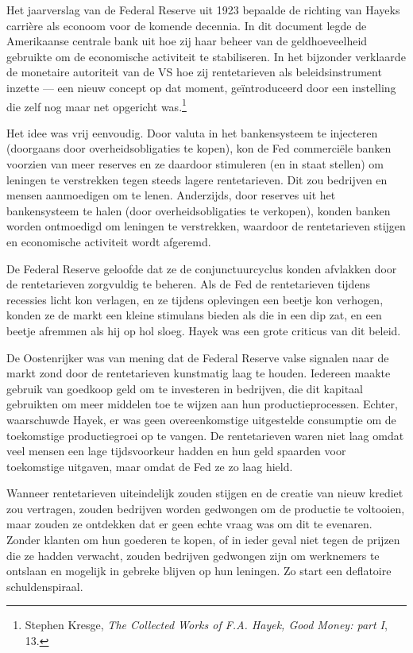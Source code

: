 \documentclass[
  a5paper,
  smalldemyvopaper,11pt,twoside,onecolumn,openright,extrafontsizes,
hidelinks]{memoir}
\begin{document}
Het jaarverslag van de Federal Reserve uit 1923 bepaalde de richting van
Hayeks carrière als econoom voor de komende decennia. In dit document
legde de Amerikaanse centrale bank uit hoe zij haar beheer van de
geldhoeveelheid gebruikte om de economische activiteit te stabiliseren.
In het bijzonder verklaarde de monetaire autoriteit van de VS hoe zij
rentetarieven als beleidsinstrument inzette --- een nieuw concept op dat
moment, geïntroduceerd door een instelling die zelf nog maar net
opgericht was.\footnote{Stephen Kresge, \emph{The Collected Works of
  F.A. Hayek, Good Money: part I}, 13.}

Het idee was vrij eenvoudig. Door valuta in het bankensysteem te
injecteren (doorgaans door overheidsobligaties te kopen), kon de Fed
commerciële banken voorzien van meer reserves en ze daardoor stimuleren
(en in staat stellen) om leningen te verstrekken tegen steeds lagere
rentetarieven. Dit zou bedrijven en mensen aanmoedigen om te lenen.
Anderzijds, door reserves uit het bankensysteem te halen (door
overheidsobligaties te verkopen), konden banken worden ontmoedigd om
leningen te verstrekken, waardoor de rentetarieven stijgen en
economische activiteit wordt afgeremd.

De Federal Reserve geloofde dat ze de conjunctuurcyclus konden afvlakken
door de rentetarieven zorgvuldig te beheren. Als de Fed de rentetarieven
tijdens recessies licht kon verlagen, en ze tijdens oplevingen een
beetje kon verhogen, konden ze de markt een kleine stimulans bieden als
die in een dip zat, en een beetje afremmen als hij op hol sloeg. Hayek
was een grote criticus van dit beleid.

De Oostenrijker was van mening dat de Federal Reserve valse signalen
naar de markt zond door de rentetarieven kunstmatig laag te houden.
Iedereen maakte gebruik van goedkoop geld om te investeren in bedrijven,
die dit kapitaal gebruikten om meer middelen toe te wijzen aan hun
productieprocessen. Echter, waarschuwde Hayek, er was geen
overeenkomstige uitgestelde consumptie om de toekomstige productiegroei
op te vangen. De rentetarieven waren niet laag omdat veel mensen een
lage tijdsvoorkeur hadden en hun geld spaarden voor toekomstige
uitgaven, maar omdat de Fed ze zo laag hield.

Wanneer rentetarieven uiteindelijk zouden stijgen en de creatie van
nieuw krediet zou vertragen, zouden bedrijven worden gedwongen om de
productie te voltooien, maar zouden ze ontdekken dat er geen echte vraag
was om dit te evenaren. Zonder klanten om hun goederen te kopen, of in
ieder geval niet tegen de prijzen die ze hadden verwacht, zouden
bedrijven gedwongen zijn om werknemers te ontslaan en mogelijk in
gebreke blijven op hun leningen. Zo start een deflatoire
schuldenspiraal.
\end{document}

